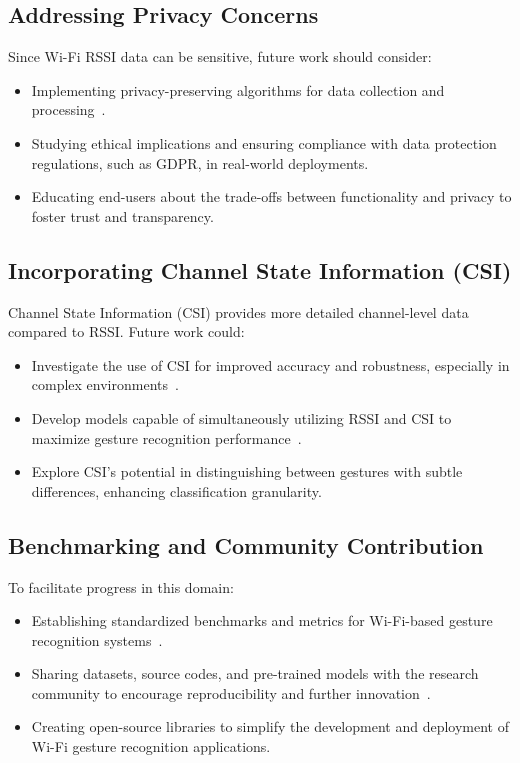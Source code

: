 \documentclass[10pt,twocolumn,letterpaper]{article}
\begin{document}
\subsection{Addressing Privacy Concerns}

Since Wi-Fi RSSI data can be sensitive, future work should consider:
\begin{itemize}
    \item Implementing privacy-preserving algorithms for data collection and processing~\cite{dwork2014algorithmic}.
    \item Studying ethical implications and ensuring compliance with data protection regulations, such as GDPR, in real-world deployments.
    \item Educating end-users about the trade-offs between functionality and privacy to foster trust and transparency.
\end{itemize}

\subsection{Incorporating Channel State Information (CSI)}

Channel State Information (CSI) provides more detailed channel-level data compared to RSSI. Future work could:
\begin{itemize}
    \item Investigate the use of CSI for improved accuracy and robustness, especially in complex environments~\cite{wang2017wifi}.
    \item Develop models capable of simultaneously utilizing RSSI and CSI to maximize gesture recognition performance~\cite{haseeb2020wisture}.
    \item Explore CSI's potential in distinguishing between gestures with subtle differences, enhancing classification granularity.
\end{itemize}

\subsection{Benchmarking and Community Contribution}

To facilitate progress in this domain:
\begin{itemize}
    \item Establishing standardized benchmarks and metrics for Wi-Fi-based gesture recognition systems~\cite{abdelnasser2015wifi}.
    \item Sharing datasets, source codes, and pre-trained models with the research community to encourage reproducibility and further innovation~\cite{haseeb2020wisture}.
    \item Creating open-source libraries to simplify the development and deployment of Wi-Fi gesture recognition applications.
\end{itemize}
\end{document}
